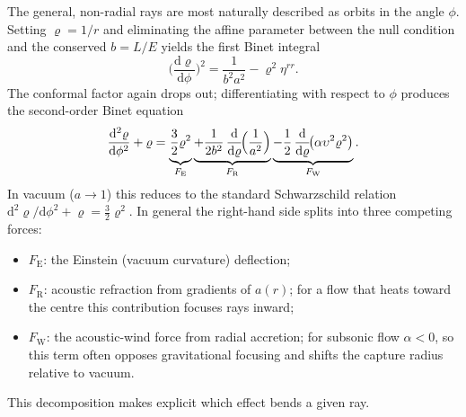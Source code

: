\documentclass[12pt,a4paper,preprint]{elsarticle}
\begin{document}
            The general, non-radial rays are most naturally described as orbits in the angle $\phi$. Setting $\varrho=1/r$ and eliminating the affine parameter between the null condition and the conserved $b=L/E$ yields the first Binet integral
            \begin{equation}
                \Biggl(\frac{\mathrm{d}\varrho}{\mathrm{d}\phi}\Biggr)^{2} = \frac{1}{b^{2}a^{2}} - \varrho^{2}\eta^{rr} .
                \label{eq:binet-first-acoustic}
            \end{equation}
            The conformal factor again drops out; differentiating with respect to $\phi$ produces the second-order Binet equation
            \begin{equation}
                \frac{\mathrm{d}^{2}\varrho}{\mathrm{d}\phi^{2}} + \varrho = \underbrace{\vphantom{\frac{\mathrm{d}}{\mathrm{d}\varrho}\Bigl(\frac{1}{a^{2}}\Bigr)}\frac{3}{2}\varrho^{2}}_{F_{\mathrm{E}}} \underbrace{+ \frac{1}{2b^{2}}\,\frac{\mathrm{d}}{\mathrm{d}\varrho}\!\Bigl(\frac{1}{a^{2}}\Bigr)}_{F_{\mathrm{R}}} \underbrace{- \vphantom{\frac{\mathrm{d}}{\mathrm{d}\varrho}\Bigl(\frac{1}{a^{2}}\Bigr)}\frac{1}{2}\,\frac{\mathrm{d}}{\mathrm{d}\varrho}\!\bigl(\alpha\upsilon^{2}\varrho^{2}\bigr)}_{F_{\mathrm{W}}} .
                \label{eq:binet-second-acoustic}
            \end{equation}
            In vacuum ($a\to 1$) this reduces to the standard Schwarzschild relation $\mathrm{d}^{2}\varrho/\mathrm{d}\phi^{2}+\varrho=\frac{3}{2}\varrho^{2}$. In general the right-hand side splits into three competing forces:
            \begin{itemize}
                \item $F_{\mathrm{E}}$: the Einstein (vacuum curvature) deflection;
                \item $F_{\mathrm{R}}$: acoustic refraction from gradients of $a(r)$; for a flow that heats toward the centre this contribution focuses rays inward;
                \item $F_{\mathrm{W}}$: the acoustic-wind force from radial accretion; for subsonic flow $\alpha<0$, so this term often opposes gravitational focusing and shifts the capture radius relative to vacuum.
            \end{itemize}
            This decomposition makes explicit which effect bends a given ray.
\end{document}
